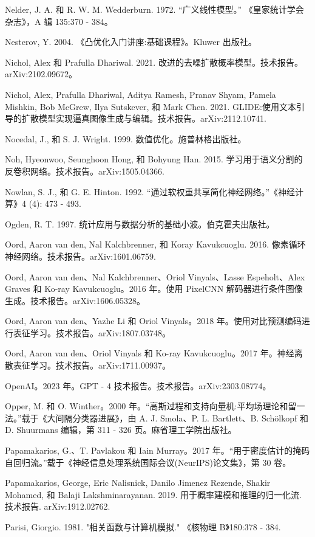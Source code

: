 \documentclass[10pt]{report}
\begin{document}
Nelder, J. A. 和 R. W. M. Wedderburn. 1972. “广义线性模型。” 《皇家统计学会杂志》，A 辑 135:370 - 384。

Nesterov, Y. 2004. 《凸优化入门讲座:基础课程》。Kluwer 出版社。

Nichol, Alex 和 Prafulla Dhariwal. 2021. 改进的去噪扩散概率模型。技术报告。arXiv:2102.09672。

Nichol, Alex, Prafulla Dhariwal, Aditya Ramesh, Pranav Shyam, Pamela Mishkin, Bob McGrew, Ilya Sutskever, 和 Mark Chen. 2021. GLIDE:使用文本引导的扩散模型实现逼真图像生成与编辑。技术报告。arXiv:2112.10741.

Nocedal, J., 和 S. J. Wright. 1999. 数值优化。施普林格出版社。

Noh, Hyeonwoo, Seunghoon Hong, 和 Bohyung Han. 2015. 学习用于语义分割的反卷积网络。技术报告。arXiv:1505.04366.

Nowlan, S. J., 和 G. E. Hinton. 1992. “通过软权重共享简化神经网络。”《神经计算》4 (4): 473 - 493.

Ogden, R. T. 1997. 统计应用与数据分析的基础小波。伯克霍夫出版社。

Oord, Aaron van den, Nal Kalchbrenner, 和 Koray Kavukcuoglu. 2016. 像素循环神经网络。技术报告。arXiv:1601.06759.

Oord, Aaron van den、Nal Kalchbrenner、Oriol Vinyals、Lasse Espeholt、Alex Graves 和 Ko-ray Kavukcuoglu。2016 年。使用 PixelCNN 解码器进行条件图像生成。技术报告。arXiv:1606.05328。

Oord, Aaron van den、Yazhe Li 和 Oriol Vinyals。2018 年。使用对比预测编码进行表征学习。技术报告。arXiv:1807.03748。

Oord, Aaron van den、Oriol Vinyals 和 Ko-ray Kavukcuoglu。2017 年。神经离散表征学习。技术报告。arXiv:1711.00937。

OpenAI。2023 年。GPT - 4 技术报告。技术报告。arXiv:2303.08774。

Opper, M. 和 O. Winther。2000 年。“高斯过程和支持向量机:平均场理论和留一法。”载于《大间隔分类器进展》，由 A. J. Smola、P. L. Bartlett、B. Schölkopf 和 D. Shuurmans 编辑，第 311 - 326 页。麻省理工学院出版社。

Papamakarios, G.、T. Pavlakou 和 Iain Murray。2017 年。“用于密度估计的掩码自回归流。”载于《神经信息处理系统国际会议(NeurIPS)论文集》，第 30 卷。

Papamakarios, George, Eric Nalisnick, Danilo Jimenez Rezende, Shakir Mohamed, 和 Balaji Lakshminarayanan. 2019. 用于概率建模和推理的归一化流. 技术报告. arXiv:1912.02762.

Parisi, Giorgio. 1981. "相关函数与计算机模拟." 《核物理 B》180:378 - 384.
\end{document}
